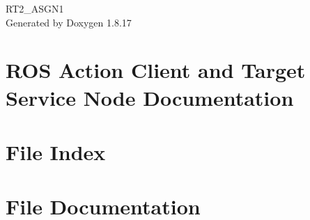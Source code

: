 \let\mypdfximage\pdfximage\def\pdfximage{\immediate\mypdfximage}\documentclass[twoside]{book}
\newcommand{\+}{\discretionary{\mbox{\scriptsize$\hookleftarrow$}}{}{}}
\newcommand{\clearemptydoublepage}{%
  \newpage{\pagestyle{empty}\cleardoublepage}%
}
\begin{document}
\hypersetup{pageanchor=false,
             bookmarksnumbered=true,
             pdfencoding=unicode
            }
\begin{titlepage}
\vspace*{7cm}
\begin{center}%
{\Large R\+T2\+\_\+\+A\+S\+G\+N1 }\\
\vspace*{1cm}
{\large Generated by Doxygen 1.8.17}\\
\end{center}
\end{titlepage}
\clearemptydoublepage
{}
\tableofcontents
\clearemptydoublepage
{}
\hypersetup{pageanchor=true}

\chapter{R\+OS Action Client and Target Service Node Documentation}
\label{index}\hypertarget{index}{}
\chapter{File Index}

\chapter{File Documentation}




\backmatter
\newpage
{}
\clearemptydoublepage
{}
\printindex
\end{document}
